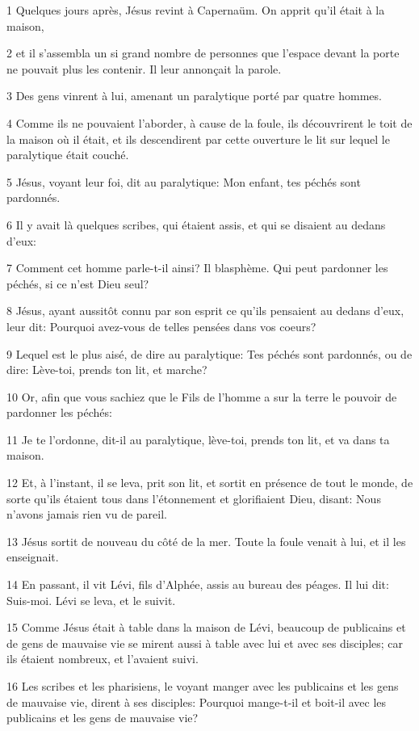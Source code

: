 \par 1 Quelques jours après, Jésus revint à Capernaüm. On apprit qu'il était à la maison,
\par 2 et il s'assembla un si grand nombre de personnes que l'espace devant la porte ne pouvait plus les contenir. Il leur annonçait la parole.
\par 3 Des gens vinrent à lui, amenant un paralytique porté par quatre hommes.
\par 4 Comme ils ne pouvaient l'aborder, à cause de la foule, ils découvrirent le toit de la maison où il était, et ils descendirent par cette ouverture le lit sur lequel le paralytique était couché.
\par 5 Jésus, voyant leur foi, dit au paralytique: Mon enfant, tes péchés sont pardonnés.
\par 6 Il y avait là quelques scribes, qui étaient assis, et qui se disaient au dedans d'eux:
\par 7 Comment cet homme parle-t-il ainsi? Il blasphème. Qui peut pardonner les péchés, si ce n'est Dieu seul?
\par 8 Jésus, ayant aussitôt connu par son esprit ce qu'ils pensaient au dedans d'eux, leur dit: Pourquoi avez-vous de telles pensées dans vos coeurs?
\par 9 Lequel est le plus aisé, de dire au paralytique: Tes péchés sont pardonnés, ou de dire: Lève-toi, prends ton lit, et marche?
\par 10 Or, afin que vous sachiez que le Fils de l'homme a sur la terre le pouvoir de pardonner les péchés:
\par 11 Je te l'ordonne, dit-il au paralytique, lève-toi, prends ton lit, et va dans ta maison.
\par 12 Et, à l'instant, il se leva, prit son lit, et sortit en présence de tout le monde, de sorte qu'ils étaient tous dans l'étonnement et glorifiaient Dieu, disant: Nous n'avons jamais rien vu de pareil.
\par 13 Jésus sortit de nouveau du côté de la mer. Toute la foule venait à lui, et il les enseignait.
\par 14 En passant, il vit Lévi, fils d'Alphée, assis au bureau des péages. Il lui dit: Suis-moi. Lévi se leva, et le suivit.
\par 15 Comme Jésus était à table dans la maison de Lévi, beaucoup de publicains et de gens de mauvaise vie se mirent aussi à table avec lui et avec ses disciples; car ils étaient nombreux, et l'avaient suivi.
\par 16 Les scribes et les pharisiens, le voyant manger avec les publicains et les gens de mauvaise vie, dirent à ses disciples: Pourquoi mange-t-il et boit-il avec les publicains et les gens de mauvaise vie?
